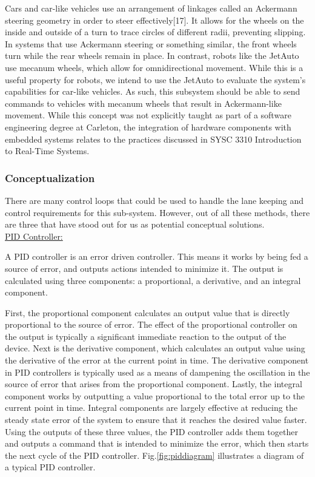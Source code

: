 \documentclass[titlepage,draft]{article}
\begin{document}
{Cars and car-like vehicles use an arrangement of linkages called an Ackermann steering geometry in order to steer effectively[17]. It allows for the wheels on the inside and outside of a turn to trace circles of different radii, preventing slipping. In systems that use Ackermann steering or something similar, the front wheels turn while the rear wheels remain in place. In contrast, robots like the JetAuto use mecanum wheels, which allow for omnidirectional movement. While this is a useful property for robots, we intend to use the JetAuto to evaluate the system’s capabilities for car-like vehicles. As such, this subsystem should be able to send commands to vehicles with mecanum wheels that result in Ackermann-like movement. While this concept was not explicitly taught as part of a software engineering degree at Carleton, the integration of hardware components with embedded systems relates to the practices discussed in SYSC 3310 Introduction to Real-Time Systems.

\subsubsection{Conceptualization}

There are many control loops that could be used to handle the lane keeping and control requirements for this sub-system. However, out of all these methods, there are three that have stood out for us as potential conceptual solutions.
\\

\underline{PID Controller:}

A PID controller is an error driven controller. This means it works by being fed a source of error, and outputs actions intended to minimize it. The output is calculated using three components: a proportional, a derivative, and an integral component.

First, the proportional component calculates an output value that is directly proportional to the source of error. The effect of the proportional controller on the output is typically a significant immediate reaction to the output of the device. Next is the derivative component, which calculates an output value using the derivative of the error at the current point in time. The derivative component in PID controllers is typically used as a means of dampening the oscillation in the source of error that arises from the proportional component. Lastly, the integral component works by outputting a value proportional to the total error up to the current point in time. Integral components are largely effective at reducing the steady state error of the system to ensure that it reaches the desired value faster.  Using the outputs of these three values, the PID controller adds them together and outputs a command that is intended to minimize the error, which then starts the next cycle of the PID controller\cite{pid_explanation}. Fig.\ref{fig:piddiagram} illustrates a diagram of a typical PID controller.\\

}
\end{document}

